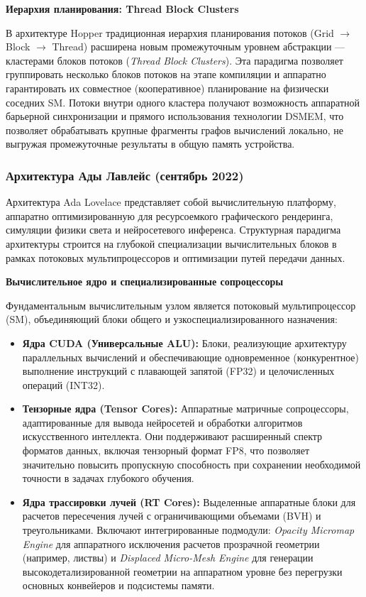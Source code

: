 \documentclass{article}[14pt]
\begin{document}
\medskip

\noindent \textbf{Иерархия планирования: Thread Block Clusters}

В архитектуре Hopper традиционная иерархия планирования потоков (Grid $\rightarrow$ Block $\rightarrow$ Thread) расширена новым промежуточным 
уровнем абстракции — кластерами блоков потоков (\textit{Thread Block Clusters}). Эта парадигма позволяет группировать несколько блоков потоков 
на этапе компиляции и аппаратно гарантировать их совместное (кооперативное) планирование на физически соседних SM. Потоки внутри одного 
кластера получают возможность аппаратной барьерной синхронизации и прямого использования технологии DSMEM, что позволяет обрабатывать крупные 
фрагменты графов вычислений локально, не выгружая промежуточные результаты в общую память устройства.

\subsubsection{Архитектура Ады Лавлейс (сентябрь 2022)}

Архитектура Ada Lovelace представляет собой вычислительную платформу, аппаратно оптимизированную для ресурсоемкого графического рендеринга, 
симуляции физики света и нейросетевого инференса. Структурная парадигма архитектуры строится на глубокой специализации вычислительных блоков 
в рамках потоковых мультипроцессоров и оптимизации путей передачи данных.

\medskip

\noindent \textbf{Вычислительное ядро и специализированные сопроцессоры}


Фундаментальным вычислительным узлом является потоковый мультипроцессор (SM), объединяющий блоки общего и узкоспециализированного назначения:
\begin{itemize}
    \item \textbf{Ядра CUDA (Универсальные ALU):} Блоки, реализующие архитектуру параллельных вычислений и обеспечивающие одновременное 
	(конкурентное) выполнение инструкций с плавающей запятой (FP32) и целочисленных операций (INT32).
    \item \textbf{Тензорные ядра (Tensor Cores):} Аппаратные матричные сопроцессоры, адаптированные для вывода нейросетей и обработки 
	алгоритмов искусственного интеллекта. Они поддерживают расширенный спектр форматов данных, включая тензорный формат FP8, что позволяет 
	значительно повысить пропускную способность при сохранении необходимой точности в задачах глубокого обучения.
    \item \textbf{Ядра трассировки лучей (RT Cores):} Выделенные аппаратные блоки для расчетов пересечения лучей с ограничивающими объемами 
	(BVH) и треугольниками. Включают интегрированные подмодули: 
    \textit{Opacity Micromap Engine} для аппаратного исключения расчетов прозрачной геометрии (например, листвы) и 
	\textit{Displaced Micro-Mesh Engine} для генерации высокодетализированной геометрии на аппаратном уровне без перегрузки основных 
	конвейеров и подсистемы памяти.
\end{itemize}
\end{document}
